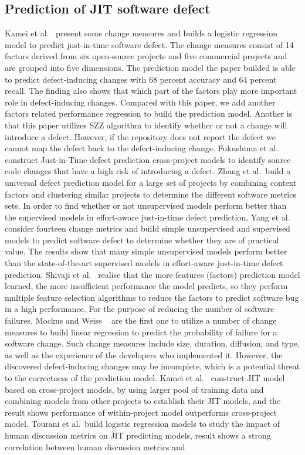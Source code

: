 \subsection{Prediction of JIT software defect}
Kamei et al.~\cite{Kamei2013TSE}  present some change measures and builds a logistic regression model to predict just-in-time software defect. The change measures consist of 14 factors derived from six open-source projects and five commercial projects and are grouped into five dimensions. The prediction model the paper builded is able to predict defect-inducing changes with 68 percent accuracy and 64 percent recall. The finding also shows that which part of the factors play more important role in defect-inducing changes. Compared with this paper, we add another factors related performance regression to build the prediction model. Another is that this paper utilizes SZZ algorithm to identify whether or not a change will introduce a defect. However, if the repository does not report the defect we cannot map the defect back to the defect-inducing change. Fukushima et al.~\cite{Fukushima:2014:ESJ} construct Just-in-Time defect prediction cross-project models to identify source code changes that have a high risk of introducing a defect. Zhang et al.~\cite{Zhang:2014:TBU}build a universal defect prediction model for a large set of projects by combining context factors and clustering similar projects to determine the different software metrics sets. In order to find whether or not unsupervised models perform better than the supervised models in effort-aware just-in-time defect prediction, Yang et al.~\cite{Yang:2016:EJD} consider fourteen change metrics and build simple unsupervised and supervised models to predict software defect to determine whether they are of practical value. The results show that many simple unsupervised models perform better than the state-of-the-art supervised models in effort-aware just-in-time defect prediction. Shivaji et al.~\cite{Shivaji2013TSE} realise that the more features (factors) prediction model learned, the more insufficient performance the model predicts, so they perform multiple feature selection algorithms to reduce the factors to predict software bug in a high performance. For the purpose of reducing the number of software failures, Mockus and Weiss ~\cite{mockus2000predicting} are the first one to utilize a number of change measures to build linear regression to predict the probability of failure for a software change. Such change measures include size, duration, diffusion, and type, as well as the experience of the developers who implemented it. However, the discovered defect-inducing changes may be incomplete, which is a potential threat to the correctness of the prediction model. Kamei et al.~\cite{kamei2016studying} construct JIT model based on cross-project models, by using larger pool of training data and combining models from other projects to establish their JIT models, and the result shows performance of within-project model outperforms cross-project model. Tourani et al.~\cite{tourani2016impact}build logistic regression models to study the impact of human discussion metrics on JIT predicting models, result shows a strong correlation between human discussion metrics and 